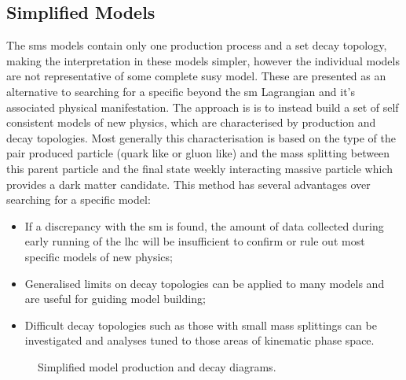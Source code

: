 \subsection{Simplified Models} %
\label{sub:simplified_models}
The \ac{sms} models contain only one production process and a set decay 
topology, making the interpretation in these models simpler, however the 
individual models are not representative of some complete \ac{susy} model. 
These are presented as an alternative to searching for a specific beyond the 
\ac{sm} Lagrangian and it's associated physical manifestation. The 
approach is is to  instead build a set of self consistent models of new 
physics, which are characterised by production and decay 
topologies\cite{ArkaniHamed:2007fw}.
Most generally this characterisation is based on the type of the pair produced 
particle (quark like or gluon like) and the mass splitting between this parent 
particle and the final state weekly interacting massive particle which provides 
a dark matter candidate.
This method has several advantages over searching for a specific model:
\begin{itemize}
\item If a discrepancy with the \ac{sm} is found, the amount of data collected  
during early running of the \ac{lhc} will be insufficient to confirm or rule 
out most specific models of new physics;
\item Generalised limits on decay topologies can be applied to many models and 
are useful for guiding model building;
\item Difficult decay topologies such as those with small mass 
splittings can be investigated and analyses tuned to those areas of kinematic 
phase space.
\end{itemize}



\begin{figure}[h!]
    \centering
    \caption{Simplified model production and decay diagrams.}
    \label{fig:T1T2feyn}
\end{figure}



